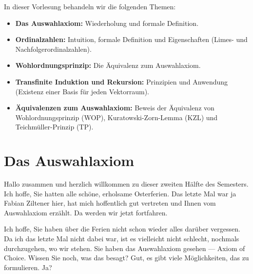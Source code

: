 


\begin{nice-box}
In dieser Vorlesung behandeln wir die folgenden Themen:
\begin{itemize}
    \item \textbf{Das Auswahlaxiom:} Wiederholung und formale Definition.
    \item \textbf{Ordinalzahlen:} Intuition, formale Definition und Eigenschaften (Limes- und Nachfolgerordinalzahlen).
    \item \textbf{Wohlordnungsprinzip:} Die Äquivalenz zum Auswahlaxiom.
    \item \textbf{Transfinite Induktion und Rekursion:} Prinzipien und Anwendung (Existenz einer Basis für jeden Vektorraum).
    \item \textbf{Äquivalenzen zum Auswahlaxiom:} Beweis der Äquivalenz von Wohlordnungsprinzip (WOP), Kuratowski-Zorn-Lemma (KZL) und Teichmüller-Prinzip (TP).
\end{itemize}
\end{nice-box}

\section{Das Auswahlaxiom}

\begin{spoken-clean}[00:00:00 - 00:01:00]
Hallo zusammen und herzlich willkommen zu dieser zweiten Hälfte des Semesters. Ich hoffe, Sie hatten alle schöne, erholsame Osterferien. Das letzte Mal war ja Fabian Ziltener hier, hat mich hoffentlich gut vertreten und Ihnen vom Auswahlaxiom erzählt. Da werden wir jetzt fortfahren.

Ich hoffe, Sie haben über die Ferien nicht schon wieder alles darüber vergessen. Da ich das letzte Mal nicht dabei war, ist es vielleicht nicht schlecht, nochmals durchzugehen, wo wir stehen. Sie haben das Auswahlaxiom gesehen --- Axiom of Choice. Wissen Sie noch, was das besagt? Gut, es gibt viele Möglichkeiten, das zu formulieren. Ja?
\end{spoken-clean}

